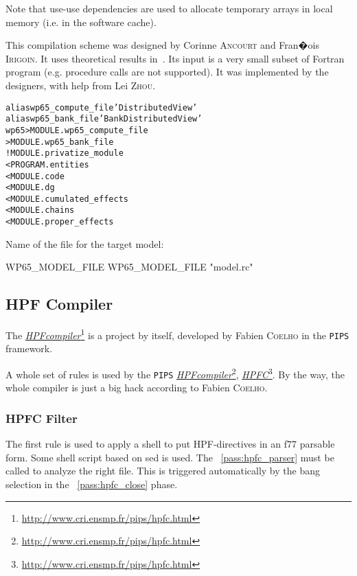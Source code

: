 \documentclass[a4paper]{report}
\newenvironment{PipsMake}{\begin{alltt}}{\end{alltt}}
\newcommand{\PipsPassRef}[1]{\texttt{\detokenize{#1}}~\ref{pass:#1}}
\newenvironment{PipsPass}[1]{\label{pass:#1}}{}
\newcommand{\LINK}[2]{\href{#2}{#1}\footnote{\url{#2}}\xspace}
\newcommand{\HPFC}{\LINK{\emph{HPFC}}{http://www.cri.ensmp.fr/pips/hpfc.html}}
\newcommand{\HPFcompiler}{\LINK{\emph{HPF\space{}compiler}}{http://www.cri.ensmp.fr/pips/hpfc.html}}
\newcommand{\Pips}{\texttt{PIPS}}
\begin{document}
Note that use-use dependencies are used to allocate temporary arrays in
local memory (i.e. in the software cache).

This compilation scheme was designed by Corinne \textsc{Ancourt} and Fran�ois
\textsc{Irigoin}. It uses theoretical results in~\cite{AI91}. Its input is a very
small subset of Fortran program (e.g. procedure calls are not supported).
It was implemented by the designers, with help from Lei \textsc{Zhou}.

\begin{PipsMake}
alias wp65_compute_file 'Distributed View'
alias wp65_bank_file 'Bank Distributed View'
wp65                            > MODULE.wp65_compute_file
                                > MODULE.wp65_bank_file
        ! MODULE.privatize_module
        < PROGRAM.entities
        < MODULE.code
        < MODULE.dg
        < MODULE.cumulated_effects
        < MODULE.chains
        < MODULE.proper_effects

\end{PipsMake}

Name of the file for the target model:
\begin{PipsProp}{WP65_MODEL_FILE}
WP65_MODEL_FILE "model.rc"
\end{PipsProp}

\subsection{HPF Compiler}
\label{subsubsection-hpf-compiler}

The \HPFcompiler{} is a project by itself, developed by Fabien
\textsc{Coelho} in the \Pips{} framework.

A whole set of rules is used by the \Pips{} \HPFcompiler{}, \HPFC{}.  By
the way, the whole compiler is just a big hack according to Fabien
\textsc{Coelho}.

\subsubsection{HPFC Filter}

The first rule is used to apply a shell to put HPF-directives in an f77 parsable form.
Some shell script based on sed is used. The \PipsPassRef{hpfc_parser} must be
called to analyze the right file. This is triggered automatically by the
bang selection in the \PipsPassRef{hpfc_close} phase.
\begin{PipsPass}{hpfc_filter}
\end{PipsPass}
\end{document}
